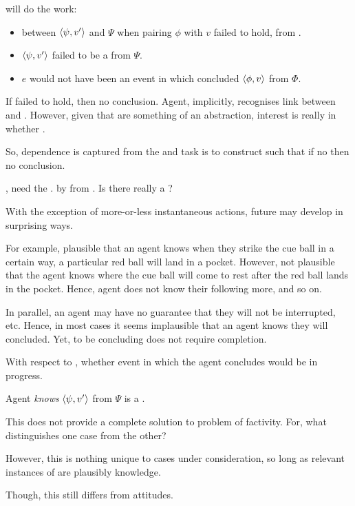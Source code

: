 \begin{note}
   will do the work:

  \begin{itemize}
  \item
     between \(\langle \psi, v' \rangle\) and \(\Psi\) when pairing \(\phi\) with \(v\) failed to hold, from .
  \item
    \(\langle \psi, v' \rangle\) failed to be a \fc{} from \(\Psi\).
  \item
    \(e\) would not have been an event in which \vAgent{} concluded \(\langle \phi, v \rangle\) from \(\Phi\).
  \end{itemize}

  If \fc{} failed to hold, then no conclusion.
  Agent, implicitly, recognises link between  and .
  However, given that  are something of an abstraction, interest is really in whether \fc{}.

  So, dependence is captured from the \agpe{} and task is to construct  such that if no  then no conclusion.
\end{note}

\begin{note}
  \qWhyV{}, need the \ros{}.
  \ros{} by \fc{} from \agpe{}.
  Is there really a \ros{}?
\end{note}

\begin{note}
  With the exception of more-or-less instantaneous actions, future may develop in surprising ways.

  For example, plausible that an agent knows when they strike the cue ball in a certain way, a particular red ball will land in a pocket.
  However, not plausible that the agent knows where the cue ball will come to rest after the red ball lands in the pocket.
  Hence, agent does not know their following more, and so on.

  In parallel, an agent may have no guarantee that they will not be interrupted, etc.
  Hence, in most cases it seems implausible that an agent knows they will concluded.
  Yet, to be concluding does not require completion.

  With respect to \fc{}, whether event in which the agent concludes would be in progress.
\end{note}

\begin{note}
  Agent \emph{knows} \(\langle \psi, v' \rangle\) from \(\Psi\) is a \fc{}.
\end{note}

\begin{note}
  This does not provide a complete solution to problem of factivity.
  For, what distinguishes one case from the other?

  However, this is nothing unique to cases under consideration, so long as relevant instances of \fc{} are plausibly knowledge.

  Though, this still differs from attitudes.
\end{note}



